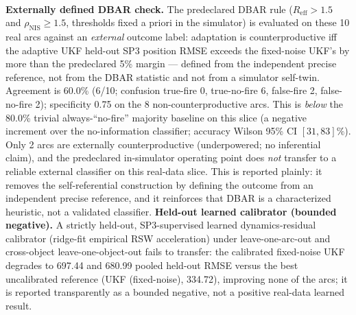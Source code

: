 \begin{table}[t]
  \\[2pt] {\footnotesize \textbf{Externally defined DBAR check.} The predeclared DBAR rule ($R_{\mathrm{eff}}>1.5$ and $\rho_{\mathrm{NIS}}\geq1.5$, thresholds fixed a priori in the simulator) is evaluated on these 10 real arcs against an \emph{external} outcome label: adaptation is counterproductive iff the adaptive UKF held-out SP3 position RMSE exceeds the fixed-noise UKF's by more than the predeclared 5\% margin --- defined from the independent precise reference, not from the DBAR statistic and not from a simulator self-twin. Agreement is 60.0\% (6/10; confusion true-fire 0, true-no-fire 6, false-fire 2, false-no-fire 2); specificity 0.75 on the 8 non-counterproductive arcs. This is \emph{below} the 80.0\% trivial always-``no-fire'' majority baseline on this slice (a negative increment over the no-information classifier; accuracy Wilson 95\% CI $[31,83]\%$). Only 2 arcs are externally counterproductive (underpowered; no inferential claim), and the predeclared in-simulator operating point does \emph{not} transfer to a reliable external classifier on this real-data slice. This is reported plainly: it removes the self-referential construction by defining the outcome from an independent precise reference, and it reinforces that DBAR is a characterized heuristic, not a validated classifier. \textbf{Held-out learned calibrator (bounded negative).} A strictly held-out, SP3-supervised learned dynamics-residual calibrator (ridge-fit empirical RSW acceleration) under leave-one-arc-out and cross-object leave-one-object-out fails to transfer: the calibrated fixed-noise UKF degrades to 697.44 and 680.99 pooled held-out RMSE versus the best uncalibrated reference (UKF (fixed-noise), 334.72), improving none of the arcs; it is reported transparently as a bounded negative, not a positive real-data learned result.}
\end{table}